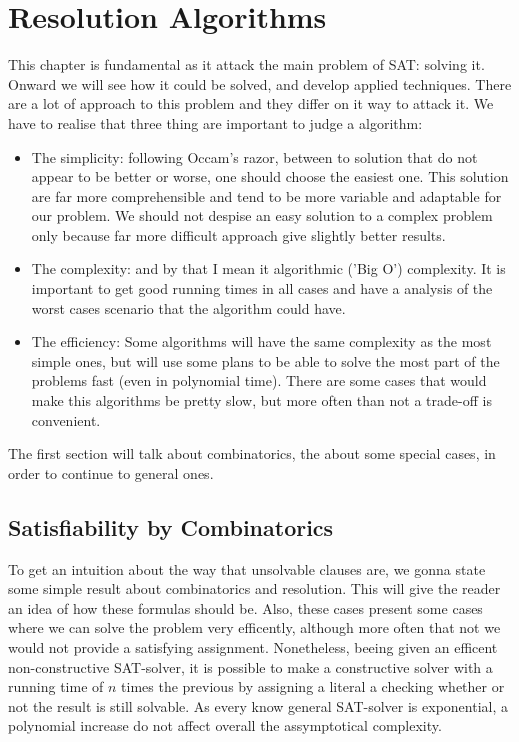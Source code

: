 
\chapter{Resolution Algorithms}

This chapter is fundamental as it attack the main problem of SAT: solving it. Onward we will see how it could be solved, and develop applied techniques. There are a lot of approach to this problem and they differ on it way to attack it. We have to realise that three thing are important to judge a algorithm:

\begin{itemize}
\item The simplicity: following Occam's razor, between to solution that do not appear to be better or worse, one should choose the easiest one. This solution are far more comprehensible and tend to be more variable and adaptable for our problem. We should not despise an easy solution to a complex problem only because far more difficult approach give slightly better results.

\item The complexity: and by that I mean it algorithmic ('Big O') complexity. It is important to get good running times in all cases and have a analysis of the worst cases scenario that the algorithm could have.

\item The efficiency: Some algorithms will have the same complexity as the most simple ones, but will use some plans to be able to solve the most part of the problems fast (even in polynomial time). There are some cases that would make this algorithms be pretty slow, but more often than not a trade-off is convenient.
\end{itemize}
  
  The first section will talk about combinatorics, the about some special cases, in order to continue to general ones. 

\section{Satisfiability by Combinatorics}


To get an intuition about the way that unsolvable clauses are, we gonna state some simple result about combinatorics and resolution. This will give the reader an idea of how these formulas should be. Also, these cases present some cases where we can solve the problem very efficently, although more often that not we would not provide a satisfying assignment. Nonetheless, beeing given an efficent non-constructive SAT-solver, it is possible to make a constructive solver with a running time of $n$ times the previous by assigning a literal a checking whether or not the result is still solvable. As every know general SAT-solver is exponential, a polynomial increase do not affect overall the assymptotical complexity.\\

